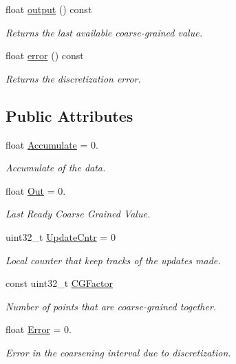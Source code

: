 \begin{DoxyCompactItemize}
float \hyperlink{classRTCoarseGrainer_a2d0cd547401422150d1293a156abc86e}{output} () const
\begin{DoxyCompactList}\small\item\em Returns the last available coarse-\/grained value. \end{DoxyCompactList}\item 
float \hyperlink{classRTCoarseGrainer_a0a2a0cf51154b2ed00d18e397e0e0c95}{error} () const
\begin{DoxyCompactList}\small\item\em Returns the discretization error. \end{DoxyCompactList}\end{DoxyCompactItemize}
\subsection*{Public Attributes}
\begin{DoxyCompactItemize}
\item 
float \hyperlink{classRTCoarseGrainer_a7912b13e79da3e88b1ea1c4067be7e08}{Accumulate} = 0.
\begin{DoxyCompactList}\small\item\em Accumulate of the data. \end{DoxyCompactList}\item 
float \hyperlink{classRTCoarseGrainer_a341ec4b52b5f79b15102fc1641a93b8f}{Out} = 0.
\begin{DoxyCompactList}\small\item\em Last Ready Coarse Grained Value. \end{DoxyCompactList}\item 
uint32\+\_\+t \hyperlink{classRTCoarseGrainer_aea262e8f08584c79ac097e8d57dfa909}{Update\+Cntr} = 0
\begin{DoxyCompactList}\small\item\em Local counter that keep tracks of the updates made. \end{DoxyCompactList}\item 
const uint32\+\_\+t \hyperlink{classRTCoarseGrainer_a99dc7fa0624717d9ec0a3b1786dfb89a}{C\+G\+Factor}
\begin{DoxyCompactList}\small\item\em Number of points that are coarse-\/grained together. \end{DoxyCompactList}\item 
float \hyperlink{classRTCoarseGrainer_a80a8cf362112f12a0f7acbeabf2477b2}{Error} = 0.
\begin{DoxyCompactList}\small\item\em Error in the coarsening interval due to discretization. \end{DoxyCompactList}\end{DoxyCompactItemize}


